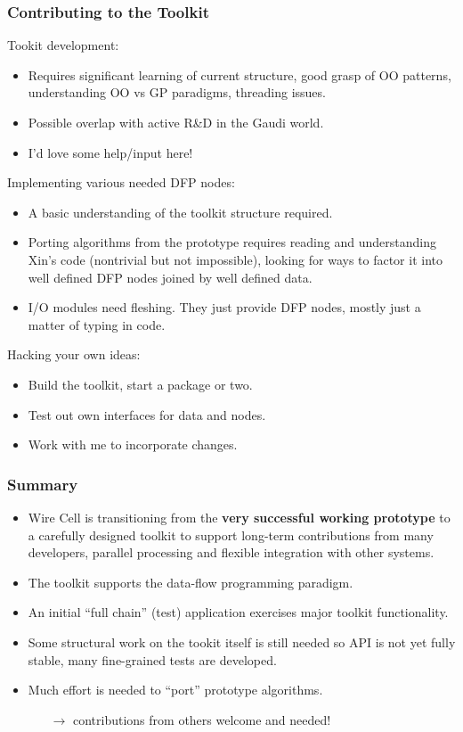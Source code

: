 \documentclass[xcolor=dvipsnames]{beamer}
\begin{document}
\begin{frame}
  \frametitle{Contributing to the Toolkit}
  Tookit development:
  \begin{itemize}\footnotesize
  \item Requires significant learning of current structure, good grasp
    of OO patterns, understanding OO vs GP paradigms, threading
    issues.  
  \item Possible overlap with active R\&D in the Gaudi world.
  \item I'd love some help/input here!
  \end{itemize}
  Implementing various needed DFP nodes:
  \begin{itemize}\footnotesize
  \item A basic understanding of the toolkit structure required.
  \item Porting algorithms from the prototype requires reading and
    understanding Xin's code (nontrivial but not impossible), looking
    for ways to factor it into well defined DFP nodes joined by well
    defined data.
  \item I/O modules need fleshing.  They just provide DFP nodes,
    mostly just a matter of typing in code.
  \end{itemize}
  Hacking your own ideas:
  \begin{itemize}\footnotesize
  \item Build the toolkit, start a package or two.
  \item Test out own interfaces for data and nodes.
  \item Work with me to incorporate changes.
  \end{itemize}
\end{frame}

\begin{frame}
  \frametitle{Summary}
  \begin{itemize}
  \item Wire Cell is transitioning from the \textbf{very successful working
    prototype} to a carefully designed toolkit to support long-term
    contributions from many developers, parallel processing and flexible
    integration with other systems.
  \item The toolkit supports the data-flow programming paradigm.
  \item An initial ``full chain'' (test) application exercises major toolkit functionality.
  \item Some structural work on the tookit itself is still needed so
    API is not yet fully stable, many fine-grained tests are developed.
  \item Much effort is needed to ``port'' prototype algorithms.
    \begin{itemize}
    \item[$\rightarrow$] contributions from others welcome and needed!
    \end{itemize}
  \end{itemize}
\end{frame}
\end{document}
